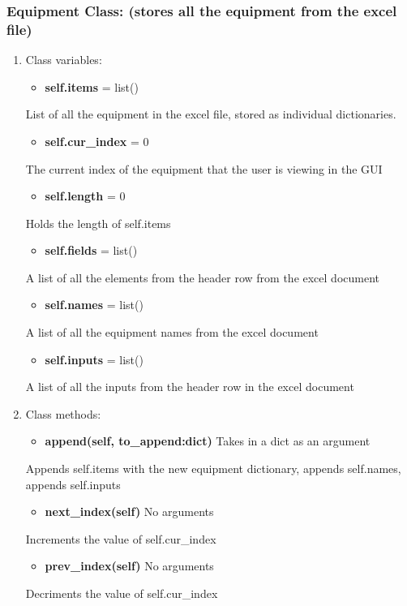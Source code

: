 \documentclass[11pt]{article}
\begin{document}
\subsubsection{Equipment Class: (stores all the equipment from the excel file)}
\label{sec:org169eebd}
\begin{enumerate}
\item Class variables:
\label{sec:orgaee5f5c}
\begin{itemize}
\item \textbf{self.items} = list()
\end{itemize}
List of all the equipment in the excel file, stored as individual dictionaries.

\begin{itemize}
\item \textbf{self.cur\_index} = 0
\end{itemize}
The current index of the equipment that the user is viewing in the GUI

\begin{itemize}
\item \textbf{self.length} = 0
\end{itemize}
Holds the length of self.items

\begin{itemize}
\item \textbf{self.fields} = list()
\end{itemize}
A list of all the elements from the header row from the excel document

\begin{itemize}
\item \textbf{self.names} = list()
\end{itemize}
A list of all the equipment names from the excel document

\begin{itemize}
\item \textbf{self.inputs} = list()
\end{itemize}
A list of all the inputs from the header row in the excel document

\item Class methods:
\label{sec:org33adc53}

\begin{itemize}
\item \textbf{append(self, to\_append:dict)} Takes in a dict as an argument
\end{itemize}
Appends self.items with the new equipment dictionary, appends self.names, appends self.inputs

\begin{itemize}
\item \textbf{next\_index(self)} No arguments
\end{itemize}
Increments the value of self.cur\_index

\begin{itemize}
\item \textbf{prev\_index(self)} No arguments
\end{itemize}
Decriments the value of self.cur\_index
\end{enumerate}
\end{document}
